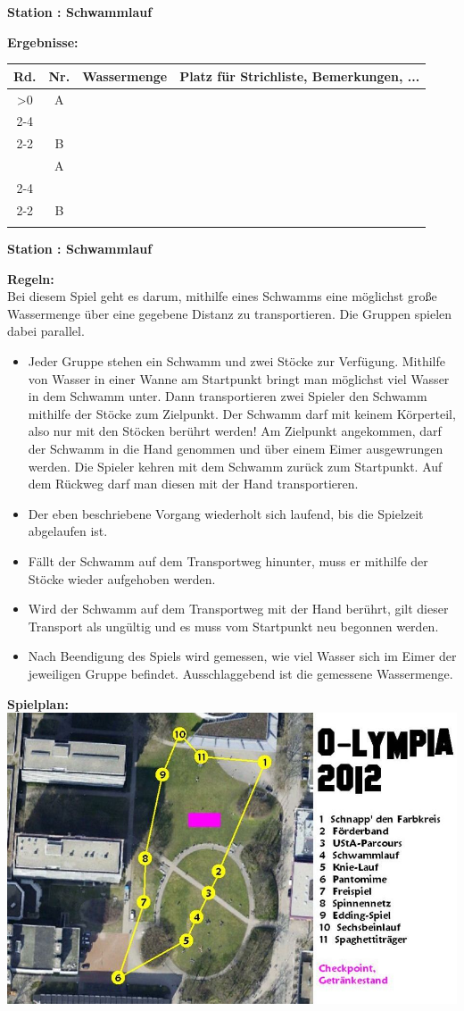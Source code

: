 \documentclass{scrartcl}
\newcommand{\replicate}[2]{\ifnum#1>0 #2
	\expandafter\replicate\expandafter{\number\numexpr#1-1}{#2}\fi}
\newcommand{\modulo}[2]{#1-((#1+#2)/#2-1)*#2}
\newcounter{station}\setcounter{station}{1}
\newcounter{ctrA}
\newcounter{ctrB}
\newcounter{currentRow}
\newcounter{noOfStations}\setcounter{noOfStations}{11}
\newenvironment{stationsheet}[3]
{\begin{center} \textbf{\huge Station \arabic{station}: #1}\\[2em]\end{center}
\textbf{\Large Ergebnisse:}\\[1em]
\setcounter{ctrA}{\value{station}}
\setcounter{ctrB}{\value{station}}
\setcounter{currentRow}{1}
\begin{tabular}{|c|c|p{3cm}|p{11cm}|}
\hline
\textbf{Rd.} & \textbf{Nr.} & \textbf{#2} & \textbf{Platz für Strichliste, Bemerkungen, ...}\\ \hline
\replicate{\value{noOfStations}}
{
\multirow{2}{*}{\arabic{currentRow}} & A\arabic{ctrA} & &
\ifthenelse{#3=0}{\\ \cline{2-4}}{\\ \cline{2-2}}
 & B\arabic{ctrB} & & \stepcounter{currentRow}
\setcounter{ctrA}{1+\modulo{\value{ctrA}-2}{\value{noOfStations}}}
\setcounter{ctrB}{1+\modulo{\value{ctrB}}{\value{noOfStations}}}
\\ \hline
}
\end{tabular}
\clearpage
\begin{center}\textbf{\huge Station \arabic{station}: #1}\end{center}
\textbf{\Large Regeln:}\\[1em]
}
{
\textbf{\Large Spielplan:}\\[1em]
\includegraphics[scale=0.57]{spielplan_11.png}
\addtocounter{station}{1}
\clearpage
}
\begin{document}
\begin{stationsheet}{Schwammlauf}{Wassermenge}{0}
Bei diesem Spiel geht es darum, mithilfe eines Schwamms eine möglichst große Wassermenge über eine gegebene Distanz zu transportieren. Die Gruppen spielen dabei parallel.
\begin{itemize}
\item Jeder Gruppe stehen ein Schwamm und zwei Stöcke zur Verfügung. Mithilfe von Wasser in einer Wanne am Startpunkt bringt man möglichst viel Wasser in dem Schwamm unter. Dann transportieren zwei Spieler den Schwamm mithilfe der Stöcke zum Zielpunkt. Der Schwamm darf mit keinem Körperteil, also nur mit den Stöcken berührt werden! Am Zielpunkt angekommen, darf der Schwamm in die Hand genommen und über einem Eimer ausgewrungen werden. Die Spieler kehren mit dem Schwamm zurück zum Startpunkt. Auf dem Rückweg darf man diesen mit der Hand transportieren.
\item Der eben beschriebene Vorgang wiederholt sich laufend, bis die Spielzeit abgelaufen ist.
\item Fällt der Schwamm auf dem Transportweg hinunter, muss er mithilfe der Stöcke wieder aufgehoben werden.
\item Wird der Schwamm auf dem Transportweg mit der Hand berührt, gilt dieser Transport als ungültig und es muss vom Startpunkt neu begonnen werden.
\item Nach Beendigung des Spiels wird gemessen, wie viel Wasser sich im Eimer der jeweiligen Gruppe befindet. Ausschlaggebend ist die gemessene Wassermenge.
\end{itemize}
\end{stationsheet}
\end{document}
